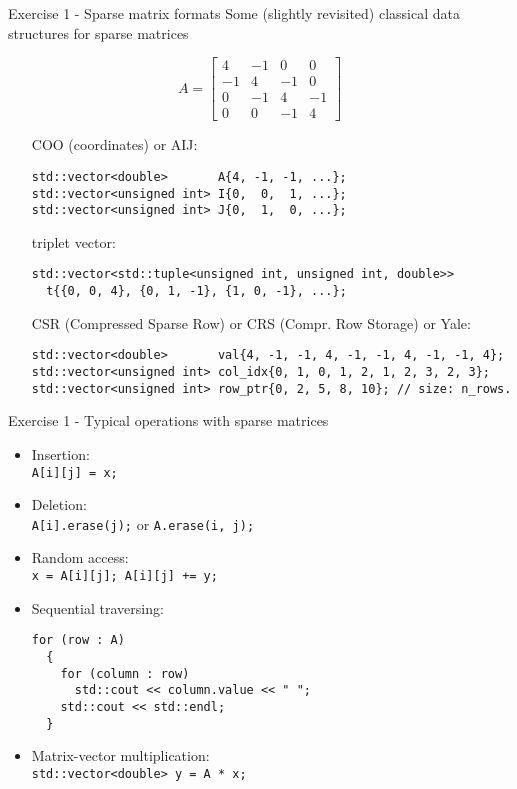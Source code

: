 \documentclass[10pt]{beamer}
\begin{document}
\begin{frame}[fragile]{Exercise 1 - Sparse matrix formats}
Some (slightly revisited) classical data structures for sparse matrices

\begin{equation*}
A = 
\begin{bmatrix}
4  & -1 & 0  & 0\\
-1 &  4 & -1 & 0\\
0  & -1 &  4 & -1\\
0  &  0 &  -1& 4
\end{bmatrix}
\end{equation*}

\begin{itemize}
\item [COO] (coordinates) or AIJ: \tiny
\begin{lstlisting}
std::vector<double>       A{4, -1, -1, ...};
std::vector<unsigned int> I{0,  0,  1, ...};
std::vector<unsigned int> J{0,  1,  0, ...};
\end{lstlisting} \normalsize
\item [triplet] vector:\tiny
\begin{lstlisting}
std::vector<std::tuple<unsigned int, unsigned int, double>> 
  t{{0, 0, 4}, {0, 1, -1}, {1, 0, -1}, ...};
\end{lstlisting} \normalsize
\item [CSR] (Compressed Sparse Row) or CRS (Compr. Row Storage) or Yale:\tiny
\begin{lstlisting}
std::vector<double>       val{4, -1, -1, 4, -1, -1, 4, -1, -1, 4};
std::vector<unsigned int> col_idx{0, 1, 0, 1, 2, 1, 2, 3, 2, 3};
std::vector<unsigned int> row_ptr{0, 2, 5, 8, 10}; // size: n_rows.
\end{lstlisting} 
\end{itemize}
\end{frame}

\begin{frame}[fragile]{Exercise 1 - Typical operations with sparse matrices} 
\begin{itemize}
\item Insertion: \\
\lstinline|A[i][j] = x;|
\item Deletion: \\
\lstinline|A[i].erase(j);| or \lstinline|A.erase(i, j);|
\item Random access: \\
\lstinline|x = A[i][j]; A[i][j] += y;|
\item Sequential traversing:
\small\begin{lstlisting}
for (row : A)
  {
    for (column : row)
      std::cout << column.value << " ";
    std::cout << std::endl;
  }
\end{lstlisting}\normalsize
\item Matrix-vector multiplication:\\
\lstinline|std::vector<double> y = A * x;|
\end{itemize}
\end{frame}
\end{document}
